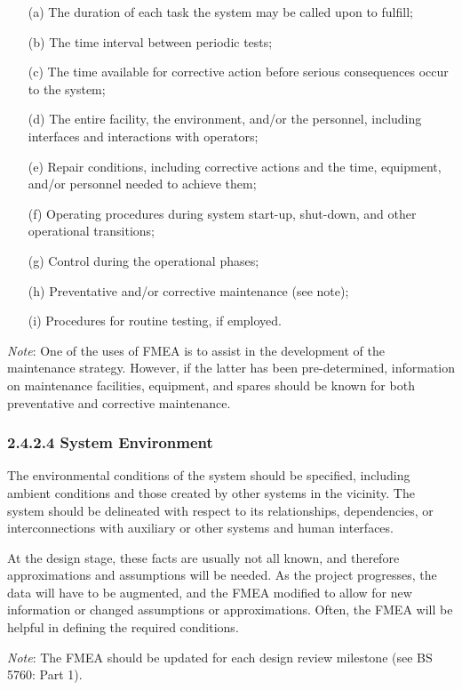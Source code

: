 \documentclass[./dissertation.tex]{subfiles}
\begin{document}
\begin{enumerate}
\item[(a)] The duration of each task the system may be called upon to fulfill;
\item[(b)] The time interval between periodic tests;
\item[(c)] The time available for corrective action before serious consequences occur to the system;
\item[(d)] The entire facility, the environment, and/or the personnel, including interfaces and interactions with operators;
\item[(e)] Repair conditions, including corrective actions and the time, equipment, and/or personnel needed to achieve them;
\item[(f)] Operating procedures during system start-up, shut-down, and other operational transitions;
\item[(g)] Control during the operational phases;
\item[(h)] Preventative and/or corrective maintenance (see note);
\item[(i)] Procedures for routine testing, if employed.
\end{enumerate}

\textit{Note}: One of the uses of FMEA is to assist in the development of the maintenance strategy. However, if the latter has been pre-determined, information on maintenance facilities, equipment, and spares should be known for both preventative and corrective maintenance.

\subsubsection{2.4.2.4 System Environment}

The environmental conditions of the system should be specified, including ambient conditions and those created by other systems in the vicinity. The system should be delineated with respect to its relationships, dependencies, or interconnections with auxiliary or other systems and human interfaces.

At the design stage, these facts are usually not all known, and therefore approximations and assumptions will be needed. As the project progresses, the data will have to be augmented, and the FMEA modified to allow for new information or changed assumptions or approximations. Often, the FMEA will be helpful in defining the required conditions.

\textit{Note}: The FMEA should be updated for each design review milestone (see BS 5760: Part 1).
\end{document}
